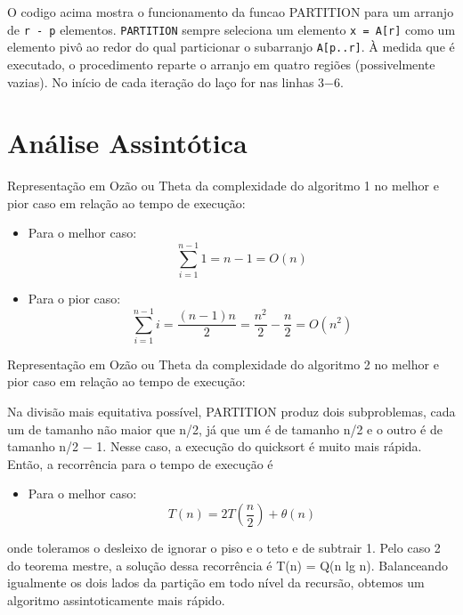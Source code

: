 \documentclass{article}
\begin{document}
O codigo acima mostra o funcionamento da funcao PARTITION para um arranjo de \texttt{r - p} elementos. \texttt{PARTITION} sempre seleciona um elemento \texttt{x = A[r]} como um elemento pivô ao redor do qual particionar o subarranjo \texttt{A[p..r]}. À medida que é executado, o procedimento reparte o arranjo em quatro regiões (possivelmente vazias). No início de cada iteração do laço for nas linhas 3−6.

\section{Análise Assintótica}

Representação em Ozão ou Theta da complexidade do algoritmo 1 no melhor e pior caso em relação ao tempo de execução:
\begin{itemize}
  \item{Para o melhor caso:}
    \begin{equation}
        \sum_{i=1}^{n-1}1= n - 1 = O(n)
    \end{equation}
  \item{Para o pior caso:}
    \begin{equation}
        \sum_{i=1}^{n-1}i= \frac{(n-1)n}{2} = \frac{n^{2}}{2} - \frac{n}{2}= O(n^{2})
    \end{equation}
\end{itemize}

Representação em Ozão ou Theta da complexidade do algoritmo 2 no melhor e pior caso em relação ao tempo de execução:

Na divisão mais equitativa possível, PARTITION produz dois subproblemas, cada um de tamanho não maior que n/2, já que um é de tamanho n/2 e o outro é de tamanho n/2 − 1. Nesse caso, a execução do quicksort é muito mais rápida. Então, a recorrência para o tempo de execução é
\begin{itemize}
  \item{Para o melhor caso:}
    \begin{equation}
       T(n) = 2T(\frac{n}{2}) + \theta (n)
      \end{equation}
\end{itemize}
onde toleramos o desleixo de ignorar o piso e o teto e de subtrair 1. Pelo caso 2 do teorema mestre, a solução dessa recorrência é T(n) = Q(n lg n). Balanceando igualmente os dois lados da partição em todo nível da recursão, obtemos um algoritmo assintoticamente mais rápido.
\end{document}
